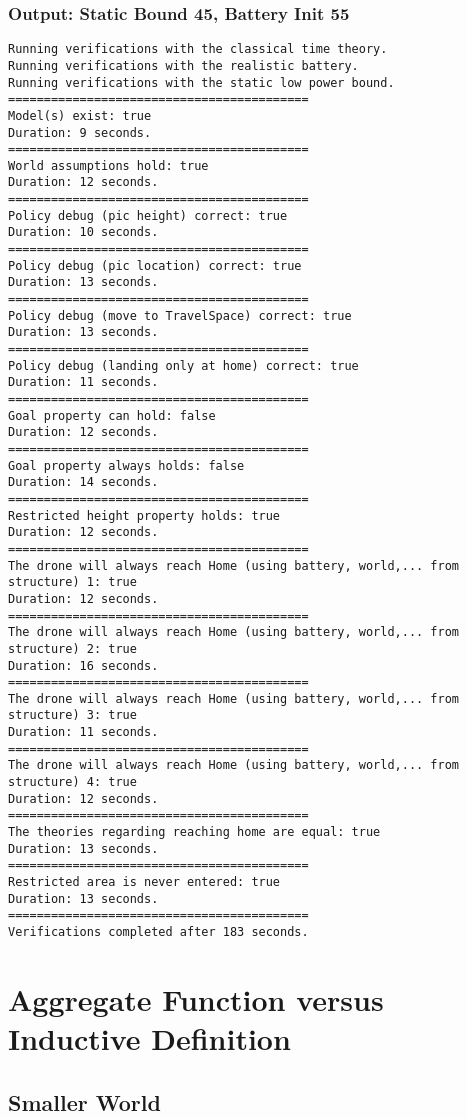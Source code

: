 \documentclass[12pt]{extarticle}
\begin{document}
\subsubsection*{Output: Static Bound 45, Battery Init 55}
\begin{lstlisting}[basicstyle=\tiny]
Running verifications with the classical time theory.
Running verifications with the realistic battery.
Running verifications with the static low power bound.
==========================================
Model(s) exist: true
Duration: 9 seconds.
==========================================
World assumptions hold: true
Duration: 12 seconds.
==========================================
Policy debug (pic height) correct: true
Duration: 10 seconds.
==========================================
Policy debug (pic location) correct: true
Duration: 13 seconds.
==========================================
Policy debug (move to TravelSpace) correct: true
Duration: 13 seconds.
==========================================
Policy debug (landing only at home) correct: true
Duration: 11 seconds.
==========================================
Goal property can hold: false
Duration: 12 seconds.
==========================================
Goal property always holds: false
Duration: 14 seconds.
==========================================
Restricted height property holds: true
Duration: 12 seconds.
==========================================
The drone will always reach Home (using battery, world,... from structure) 1: true
Duration: 12 seconds.
==========================================
The drone will always reach Home (using battery, world,... from structure) 2: true
Duration: 16 seconds.
==========================================
The drone will always reach Home (using battery, world,... from structure) 3: true
Duration: 11 seconds.
==========================================
The drone will always reach Home (using battery, world,... from structure) 4: true
Duration: 12 seconds.
==========================================
The theories regarding reaching home are equal: true
Duration: 13 seconds.
==========================================
Restricted area is never entered: true
Duration: 13 seconds.
==========================================
Verifications completed after 183 seconds.
\end{lstlisting}

\section{Aggregate Function versus Inductive Definition}
\subsection{Smaller World}
\label{app:afvsid-small}
\end{document}
